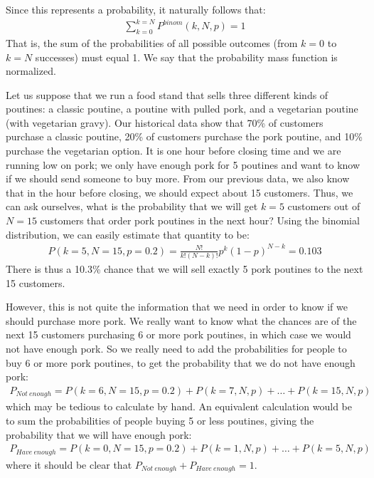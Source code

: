 Since this represents a probability, it naturally follows that:
\begin{align}
\label{eqn:binomialP_norm}
\sum_{k=0}^{k=N}P^{binom}(k,N,p)=1
\end{align}
That is, the sum of the probabilities of all possible outcomes (from $k=0$ to $k=N$ successes) must equal 1. We say that the probability mass function is normalized.

Let us suppose that we run a food stand that sells three different kinds of poutines: a classic poutine, a poutine with pulled pork, and a vegetarian poutine (with vegetarian gravy). Our historical data show that 70\% of customers purchase a classic poutine, 20\% of customers purchase the pork poutine, and 10\% purchase the vegetarian option. It is one hour before closing time and we are running low on pork; we only have enough pork for 5 poutines and want to know if we should send someone to buy more. From our previous data, we also know that in the hour before closing, we should expect about 15 customers. Thus, we can ask ourselves, what is the probability that we will get $k=5$ customers out of $N=15$ customers that order pork poutines in the next hour? Using the binomial distribution, we can easily estimate that quantity to be:
\begin{align*}
P(k=5,N=15,p=0.2)=\frac{N!}{k!(N-k)!}p^k(1-p)^{N-k}=0.103
\end{align*}
There is thus a 10.3\% chance that we will sell exactly 5 pork poutines to the next 15 customers.


However, this is not quite the  information that we need in order to know if we should purchase more pork. We really want to know what the chances are of the next 15 customers purchasing 6 or more pork poutines, in which case we would not have enough pork. So we really need to add the probabilities for people to buy 6 or more pork poutines, to get the probability that we do not have enough pork:
\begin{align*}
P_{Not\: enough}=P(k=6,N=15,p=0.2)+P(k=7,N,p)+\dots+P(k=15,N,p)
\end{align*}
which may be tedious to calculate by hand. An equivalent calculation would be to sum the probabilities of people buying 5 or less poutines, giving the probability that we will have enough pork:
\begin{align*}
P_{Have\: enough}=P(k=0,N=15,p=0.2)+P(k=1,N,p)+\dots+P(k=5,N,p)
\end{align*}
where it should be clear that $P_{Not\: enough}+P_{Have\: enough}=1$.

